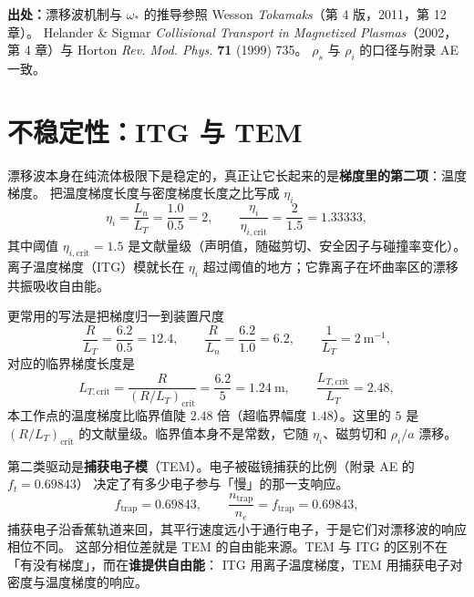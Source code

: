 {\footnotesize
\textbf{出处：}漂移波机制与 $\omega_*$ 的推导参照 Wesson \emph{Tokamaks}（第 4 版，2011，第 12 章）。
Helander \& Sigmar \emph{Collisional Transport in Magnetized Plasmas}（2002，第 4 章）与
Horton \emph{Rev. Mod. Phys.} \textbf{71} (1999) 735。
$\rho_s$ 与 $\rho_i$ 的口径与附录 AE 一致。
}

\section{不稳定性：ITG 与 TEM}
\label{sec:app-af-instability}

漂移波本身在纯流体极限下是稳定的，真正让它长起来的是\textbf{梯度里的第二项}：温度梯度。
把温度梯度长度与密度梯度长度之比写成 $\eta_i$
\begin{equation}
\eta_i=\frac{L_n}{L_T}=\frac{1.0}{0.5}=2,
\qquad
\frac{\eta_i}{\eta_{i,\mathrm{crit}}}=\frac{2}{1.5}=1.33333,
\label{eq:app-af-eta}
\end{equation}
其中阈值 $\eta_{i,\mathrm{crit}}=1.5$ 是文献量级（声明值，随磁剪切、安全因子与碰撞率变化）。
离子温度梯度（ITG）模就长在 $\eta_i$ 超过阈值的地方；它靠离子在坏曲率区的漂移共振吸收自由能。

更常用的写法是把梯度归一到装置尺度
\begin{equation}
\frac{R}{L_T}=\frac{6.2}{0.5}=12.4,
\qquad
\frac{R}{L_n}=\frac{6.2}{1.0}=6.2,
\qquad
\frac{1}{L_T}=2\ \mathrm{m^{-1}},
\label{eq:app-af-rlt}
\end{equation}
对应的临界梯度长度是
\begin{equation}
L_{T,\mathrm{crit}}=\frac{R}{(R/L_T)_{\mathrm{crit}}}=\frac{6.2}{5}=1.24\ \mathrm{m},
\qquad
\frac{L_{T,\mathrm{crit}}}{L_T}=2.48,
\label{eq:app-af-ltcrit}
\end{equation}
本工作点的温度梯度比临界值陡 $2.48$ 倍（超临界幅度 $1.48$）。这里的 $5$ 是
$(R/L_T)_{\mathrm{crit}}$ 的文献量级。临界值本身不是常数，它随 $\eta_i$、磁剪切和 $\rho_i/a$ 漂移。

第二类驱动是\textbf{捕获电子模}（TEM）。电子被磁镜捕获的比例（附录 AE 的 $f_t=0.69843$）
决定了有多少电子参与「慢」的那一支响应。
\begin{equation}
f_{\mathrm{trap}}=0.69843,
\qquad
\frac{n_{\mathrm{trap}}}{n_e}=f_{\mathrm{trap}}=0.69843,
\label{eq:app-af-tem}
\end{equation}
捕获电子沿香蕉轨道来回，其平行速度远小于通行电子，于是它们对漂移波的响应相位不同。
这部分相位差就是 TEM 的自由能来源。TEM 与 ITG 的区别不在「有没有梯度」，而在\textbf{谁提供自由能}：
ITG 用离子温度梯度，TEM 用捕获电子对密度与温度梯度的响应。


